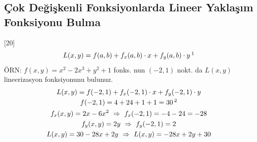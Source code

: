 \documentclass[11pt,a4paper]{article}
\begin{document}
\subsection{Çok Değişkenli Fonksiyonlarda Lineer Yaklaşım Fonksiyonu Bulma}
[20]
\[ L(x,y)=f(a,b)+f_x(a,b)\cdot x+f_y(a,b)\cdot y\,\footnotemark \]
ÖRN: $f(x,y)=x^2-2x^3+y^2+1$ fonks. nun $(-2,1)$ nokt. da $L(x,y)$ lineerizasyon fonksiyonunu bulunuz.
\begin{gather*}
L(x,y)=f(-2,1)+f_x(-2,1)\cdot x+f_y(-2,1)\cdot y\\
f(-2,1)=4+24+1+1=30\,\footnotemark\\
f_x(x,y)=2x-6x^2\ \Rightarrow\ f_x(-2,1)=-4-24=-28\\
f_y(x,y)=2y\ \Rightarrow\ f_y(-2,1)=2\\
L(x,y)=30-28x+2y\ \Rightarrow\ L(x,y)=-28x+2y+30
\end{gather*}
\end{document}
